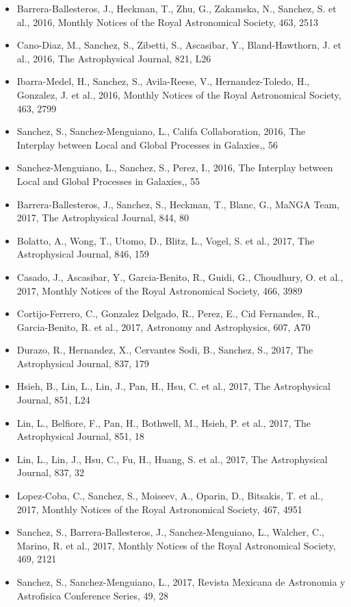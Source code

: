 \documentclass{letter}
\begin{document}
\begin{enumerate}
\begin{itemize}
\item Barrera-Ballesteros, J., Heckman, T., Zhu, G., Zakamska, N., Sanchez, S. et al., 2016, Monthly Notices of the Royal Astronomical Society, 463, 2513
\item Cano-Diaz, M., Sanchez, S., Zibetti, S., Ascasibar, Y., Bland-Hawthorn, J. et al., 2016, The Astrophysical Journal, 821, L26
\item Ibarra-Medel, H., Sanchez, S., Avila-Reese, V., Hernandez-Toledo, H., Gonzalez, J. et al., 2016, Monthly Notices of the Royal Astronomical Society, 463, 2799
\item Sanchez, S., Sanchez-Menguiano, L., Califa Collaboration, 2016, The Interplay between Local and Global Processes in Galaxies,, 56
\item Sanchez-Menguiano, L., Sanchez, S., Perez, I., 2016, The Interplay between Local and Global Processes in Galaxies,, 55
\item Barrera-Ballesteros, J., Sanchez, S., Heckman, T., Blanc, G., MaNGA Team, 2017, The Astrophysical Journal, 844, 80
\item Bolatto, A., Wong, T., Utomo, D., Blitz, L., Vogel, S. et al., 2017, The Astrophysical Journal, 846, 159
\item Casado, J., Ascasibar, Y., Garcia-Benito, R., Guidi, G., Choudhury, O. et al., 2017, Monthly Notices of the Royal Astronomical Society, 466, 3989
\item Cortijo-Ferrero, C., Gonzalez Delgado, R., Perez, E., Cid Fernandes, R., Garcia-Benito, R. et al., 2017, Astronomy and Astrophysics, 607, A70
\item Durazo, R., Hernandez, X., Cervantes Sodi, B., Sanchez, S., 2017, The Astrophysical Journal, 837, 179
\item Hsieh, B., Lin, L., Lin, J., Pan, H., Hsu, C. et al., 2017, The Astrophysical Journal, 851, L24
\item Lin, L., Belfiore, F., Pan, H., Bothwell, M., Hsieh, P. et al., 2017, The Astrophysical Journal, 851, 18
\item Lin, L., Lin, J., Hsu, C., Fu, H., Huang, S. et al., 2017, The Astrophysical Journal, 837, 32
\item Lopez-Coba, C., Sanchez, S., Moiseev, A., Oparin, D., Bitsakis, T. et al., 2017, Monthly Notices of the Royal Astronomical Society, 467, 4951
\item Sanchez, S., Barrera-Ballesteros, J., Sanchez-Menguiano, L., Walcher, C., Marino, R. et al., 2017, Monthly Notices of the Royal Astronomical Society, 469, 2121
\item Sanchez, S., Sanchez-Menguiano, L., 2017, Revista Mexicana de Astronomia y Astrofisica Conference Series, 49, 28

\end{itemize}
\end{enumerate}
\end{document}
